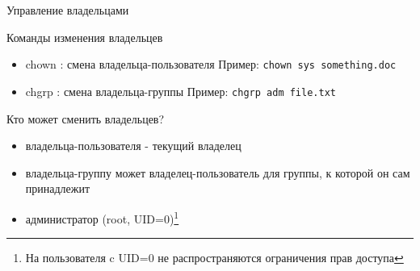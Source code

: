\begin{frame}[fragile]{Управление владельцами}

  Команды изменения владельцев
  \begin{itemize} 
    \item \alert{chown} : смена владельца-пользователя \newline
      Пример: \verb+chown sys something.doc+
    \item \alert{chgrp} : смена владельца-группы \newline
      Пример: \verb+chgrp adm file.txt+
  \end{itemize} \pause

  Кто может сменить владельцев?
  \begin{itemize}
    \item владельца-пользователя  - текущий владелец
    \item владельца-группу может владелец-пользователь для группы, к которой он сам принадлежит
    \item администратор (root, UID=0)\footnote{На пользователя c UID=0 не распространяются ограничения прав доступа} 
  \end{itemize} 
\end{frame}
